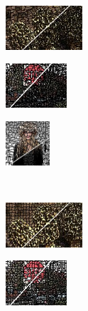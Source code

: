\begin{figure}
	\begin{subfigure}[b]{0.02\textwidth}
	\end{subfigure}
	\begin{subfigure}[b]{0.16\textwidth}
		\includegraphics[height=1.65cm]{pictures/bsds500/ers/cropped/ers_208078_contours}
	\end{subfigure}
	\begin{subfigure}[b]{0.129\textwidth}
		\includegraphics[height=1.65cm]{pictures/sbd/ers/cropped/ers_6000067_contours}
	\end{subfigure}
	\begin{subfigure}[b]{0.10\textwidth}
		\includegraphics[height=1.65cm]{pictures/fash/ers/cropped/ers_132_contours}
	\end{subfigure}\\
	\begin{subfigure}[b]{0.02\textwidth}
	\end{subfigure}
	\begin{subfigure}[b]{0.16\textwidth}
		\includegraphics[height=1.65cm]{pictures/bsds500/pb/cropped/pb_208078_contours}
	\end{subfigure}
	\begin{subfigure}[b]{0.129\textwidth}
		\includegraphics[height=1.65cm]{pictures/sbd/pb/cropped/pb_6000067_contours}

\end{subfigure}
\end{figure}
